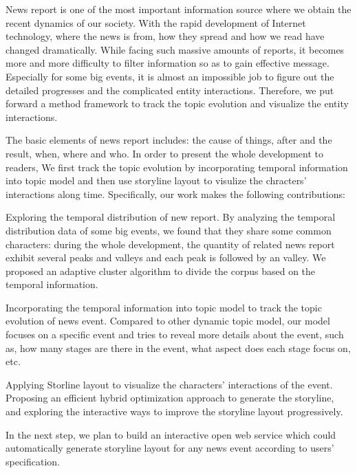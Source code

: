 \begin{eabstract}
  News report is one of the most important information source where 
  we obtain the recent dynamics of our society. With the rapid
  development of Internet technology, where the news is from, how
  they spread and how we read have changed dramatically. While facing
  such massive amounts of reports, it becomes more and more
  difficulty to filter information so as to gain effective message.
  Especially for some big events, it is almost an impossible job to
  figure out the detailed progresses and the complicated entity
  interactions. Therefore, we put forward a method framework to 
  track the topic evolution and visualize the entity interactions.

  The basic elements of news report includes: the cause of things, after
  and the result, when, where and who. In order to present the whole
  development to readers, We first track the topic evolution
  by incorporating temporal information into topic model and then use
  storyline layout to visulize the chracters' interactions along time.
  Specifically, our work makes the following contributions:

  \begin{asparaenum}[(1)]
    \item Exploring the temporal distribution of new report. By
    analyzing the temporal distribution data of some big events, we
    found that they share some common characters: during the 
    whole development, the quantity of related news report exhibit
    several peaks and valleys and each peak is followed by an valley.
    We proposed an adaptive cluster algorithm to divide the corpus
    based on the temporal information.
    \item Incorporating the temporal information into topic model to
    track the topic evolution of news event. Compared to other dynamic
    topic model, our model focuses on a specific event and tries to 
    reveal more details about the event, such as, how many stages are
    there in the event, what aspect does each stage focus on, etc. 
    \item Applying Storline layout to visualize the characters'
    interactions of the event. Proposing an efficient hybrid
    optimization approach to generate the storyline, and exploring
    the interactive ways to improve the storyline layout progressively. 
  \end{asparaenum}

  In the next step, we plan to build an interactive open web service
  which could automatically generate storyline layout for any news
  event according to users' specification.

\end{eabstract}

